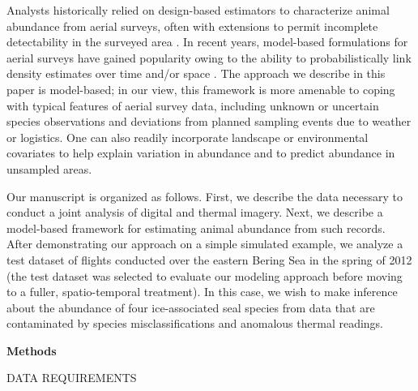 \documentclass[12pt,fleqn]{article}
\begin{document}
\begin{flushleft}
\hspace{.5in}Analysts historically relied on design-based estimators \citep{Cochran1977,Thompson2002} to characterize animal abundance from aerial surveys, often
with extensions to permit incomplete detectability in the surveyed area \citep[e.g.][]{SteinhorstSamuel1989,BucklandEtAl2001}. In recent years, model-based formulations
for aerial surveys have gained popularity owing to the ability to probabilistically link density estimates over time and/or space \citep[see, e.g.,][]{HedleyBuckland2004,JohnsonEtAl2010,MooreBarlow2011,ConnEtAl2012,VerHoefEtAl2013}. The approach we describe in this paper is model-based; in our view, this framework is more amenable to coping with typical features of aerial survey data, including unknown or uncertain species observations and deviations from planned sampling events due to weather or logistics.  One can also readily incorporate landscape or environmental covariates to help explain variation in abundance and to predict abundance in unsampled areas.

\hspace{.5in}Our manuscript is organized as follows.  First, we describe the data necessary to conduct a joint analysis of digital and thermal imagery. Next, we describe a model-based framework for estimating animal
abundance from such records. After demonstrating our approach on a simple simulated example,
we analyze a test dataset of flights conducted over the eastern Bering Sea in the spring of 2012 (the test
dataset was selected to evaluate our modeling approach before moving
to a fuller, spatio-temporal treatment).  In this case, we wish to make inference about the
abundance of four ice-associated seal species from data that are contaminated by
species misclassifications and anomalous thermal readings.

\vspace{.3in}

{\bf Methods} \\
\vspace{.15in}

DATA REQUIREMENTS \\
\vspace{.15in}


\end{flushleft}
\end{document}
